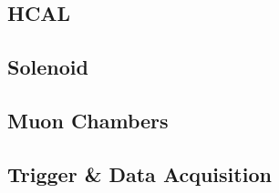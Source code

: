 \subsection{HCAL}

\subsection{Solenoid}

\subsection{Muon Chambers}

\subsection{Trigger & Data Acquisition}


%
% 
% 
